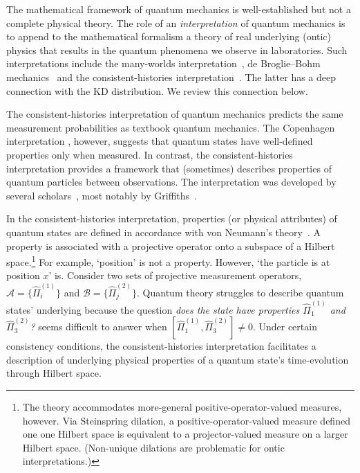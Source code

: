 \documentclass[%
 reprint,
superscriptaddress,
nofootinbib,
bibnotes,
 amsmath,amssymb,
 aps,
]{revtex4-1}
\theoremstyle{plain}
\begin{document}
The mathematical framework of quantum mechanics is well-established but not a complete physical theory.  The role of an \textit{interpretation}  of quantum mechanics \cite{lewis2016quantum} is to append to the mathematical formalism a theory of 
real underlying (ontic) physics that results in the quantum phenomena we observe in laboratories. Such interpretations include the many-worlds interpretation~\cite{Everett73, Dewitt15}, de Broglie--Bohm mechanics~\cite{Bohm52} and the consistent-histories interpretation~\cite{Griffiths84}. The latter has a deep connection with the KD distribution. We review this connection below.

The consistent-histories interpretation of quantum mechanics predicts the same measurement probabilities as textbook quantum mechanics. The Copenhagen interpretation \cite{Fay24}, however, suggests that quantum states have well-defined properties only when measured. In contrast, the consistent-histories interpretation provides  a framework that (sometimes) describes properties of quantum particles between observations. 
The interpretation was developed by several scholars~\cite{GellMan93, Omnes99, Hartle07, Hartle10}, most notably by Griffiths~\cite{Griffiths84, Hohenberg10}. 

In the consistent-histories interpretation, properties (or physical attributes) of quantum states are defined in accordance with von Neumann's theory~\cite{Neumann18, Griffiths84}. A property is associated with a projective operator onto a subspace of a Hilbert space.\footnote{The theory accommodates more-general positive-operator-valued measures, however. Via Steinspring dilation, a positive-operator-valued measure defined one one Hilbert space is equivalent to a projector-valued measure on a larger Hilbert space. 
(Non-unique dilations are problematic for ontic interpretations.)} For example, `position' is not a property. However,  `the particle is at position $x$' is.  Consider two sets of projective measurement operators, $\mathcal{A} = \{ \hat{\Pi}^{(1)}_i \}$ and $\mathcal{B} = \{ \hat{\Pi}^{(2)}_j \}$. 
Quantum theory struggles 
to describe quantum states' underlying because
the question \emph{does the state have properties $ \hat{\Pi}^{(1)}_1$ and $ \hat{\Pi}^{(2)}_3$?} seems difficult to answer when $[ \hat{\Pi}^{(1)}_1,  \hat{\Pi}^{(2)}_3]\neq 0$. Under certain consistency conditions, the consistent-histories interpretation facilitates a description of underlying physical properties of a quantum state's time-evolution through Hilbert space.  
\end{document}
